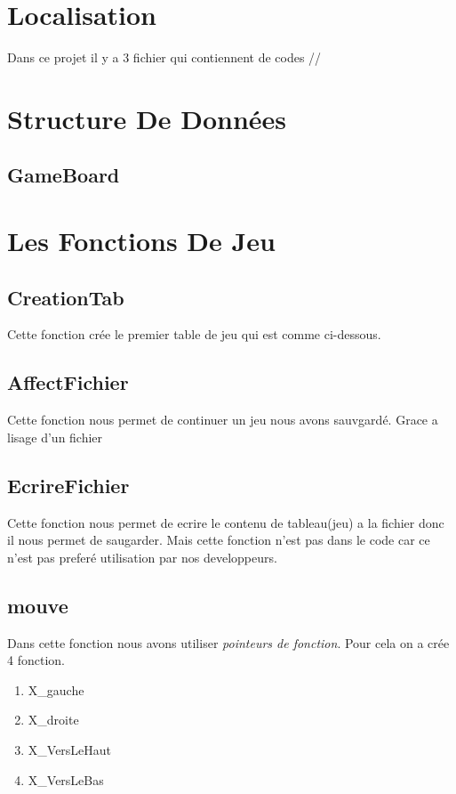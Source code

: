 \documentclass{article}
\begin{document}
\section{Localisation}
Dans ce projet il y a 3 fichier qui contiennent de codes
//
\begin{itamize}


\section{Structure De Données}

\subsection{GameBoard}


\section{Les Fonctions De Jeu}

\subsection{CreationTab}
Cette fonction crée le premier table de jeu qui est comme ci-dessous.


\subsection{AffectFichier}
Cette fonction nous permet de continuer un jeu nous avons sauvgardé. Grace a lisage d'un fichier

\subsection{EcrireFichier}
Cette fonction nous permet de ecrire le contenu de tableau(jeu) a la fichier donc il nous permet de saugarder.
Mais cette fonction n'est pas dans le code car ce n'est pas preferé utilisation par nos developpeurs.

\subsection{mouve}
Dans cette fonction nous avons utiliser \textit{pointeurs de fonction}. Pour cela on a crée 4 fonction.	

\begin{enumerate}
	\item X\_gauche 			
	\item X\_droite 			
	\item X\_VersLeHaut		
	\item X\_VersLeBas		
\end{enumerate}


\end{itamize}
\end{document}
